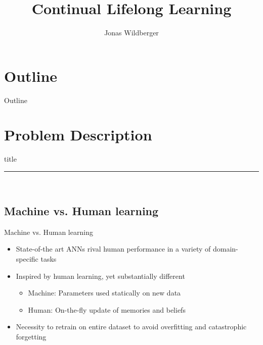 \documentclass{beamer}
\title{Continual Lifelong Learning}
\author{Jonas Wildberger}
\institute{University of Oxford}
\date{} %
\begin{document}
{ 
\frame{\titlepage}}

\section*{Outline}\begin{frame}{Outline}\tableofcontents\end{frame}

\section{Problem Description}
    \begin{frame}[plain]
        \vfill
      \centering
      \begin{beamercolorbox}[sep=8pt,center,shadow=true,rounded=true]{title}
        \insertsectionhead\par%
        \color{oxfordblue}\noindent\rule{10cm}{1pt} \\
       
      \end{beamercolorbox}
      \vfill
  \end{frame}


\subsection{Machine vs. Human learning}
\begin{frame}{Machine vs. Human learning}
\begin{itemize}
	\item<1-> State-of-the art ANNs rival human performance in a variety of domain-specific tasks
	
	\item<2-> Inspired by human learning, yet substantially different
	\begin{itemize}
		\item<2-> Machine: Parameters used statically on new data
		\item<2-> Human: On-the-fly update of memories and beliefs
	\end{itemize}
	\item<3-> Necessity to retrain on entire dataset to avoid overfitting and catastrophic forgetting
\end{itemize}

\begin{center}
\end{center}
\end{frame}
\end{document}
